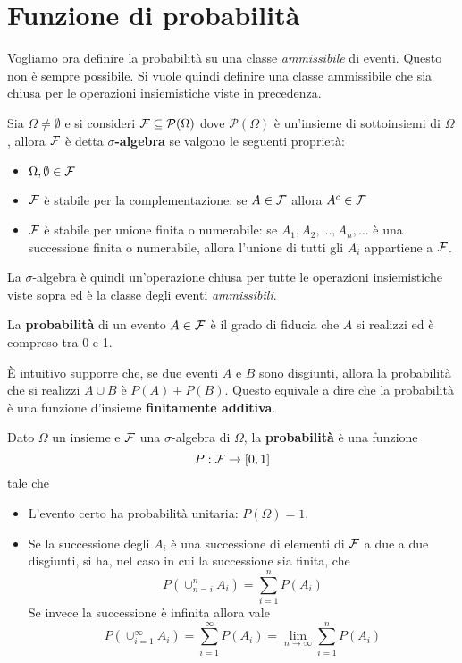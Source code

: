 \section{Funzione di probabilità}
Vogliamo ora definire la probabilità su una classe \emph{ammissibile} di eventi. Questo non è 
sempre possibile. Si vuole quindi definire una classe ammissibile che sia chiusa per le operazioni
insiemistiche viste in precedenza.

\begin{definition}
	Sia $\Omega \neq \emptyset$ e si consideri $\mathcal{F} \subseteq \mathcal{P}(\Omega)$ dove 
	$\mathcal{P}(\Omega)$ è
	un'insieme di sottoinsiemi di $\Omega$, allora $\mathcal{F}$ è detta $\sigma$\textbf{-algebra} se
	valgono le seguenti proprietà:
	\begin{itemize}
		\item $\Omega, \emptyset \in \mathcal{F}$
		\item $\mathcal{F}$ è stabile per la complementazione: se $A \in \mathcal{F}$ allora $A^c \in \mathcal{F}$
		\item $\mathcal{F}$ è stabile per unione finita o numerabile: se $A_1, A_2, ..., A_n, ...$ è una 
			successione finita o numerabile, allora l'unione di tutti gli $A_i$ appartiene a $\mathcal{F}$.
	\end{itemize}
\end{definition}

La $\sigma$-algebra è quindi un'operazione chiusa per tutte le operazioni insiemistiche viste
sopra ed è la classe degli eventi \emph{ammissibili}.

La \textbf{probabilità} di un evento $A \in \mathcal{F}$ è il grado di fiducia che $A$ si realizzi ed è 
compreso tra 0 e 1.

\`E intuitivo supporre che, se due eventi $A$ e $B$ sono disgiunti, allora la probabilità che si
realizzi $A \cup B$ è $P(A) + P(B)$. Questo equivale a dire che la probabilità è una funzione 
d'insieme \textbf{finitamente additiva}.

\begin{definition}
	Dato $\Omega$ un insieme e $\mathcal{F}$ una $\sigma$-algebra di $\Omega$, la \textbf{probabilità} è
	una funzione
	\[ P : \mathcal{F} \to [0, 1] \]
	tale che
	\begin{itemize}
		\item L'evento certo ha probabilità unitaria: $P(\Omega) = 1$.
		\item Se la successione degli $A_i$ è una successione di elementi di $\mathcal{F}$ a due a due
			disgiunti, si ha, nel caso in cui la successione sia finita, che
			\[ P (\cup_{n=i}^n A_i) = \sum_{i=1}^n P(A_i) \]
			Se invece la successione è infinita allora vale
			\[
				P (\cup_{i=1}^\infty A_i) = \sum_{i=1}^\infty P(A_i) =
				\lim_{n \to \infty} \sum_{i=1}^n P(A_i)
			\]
	\end{itemize}
\end{definition}

